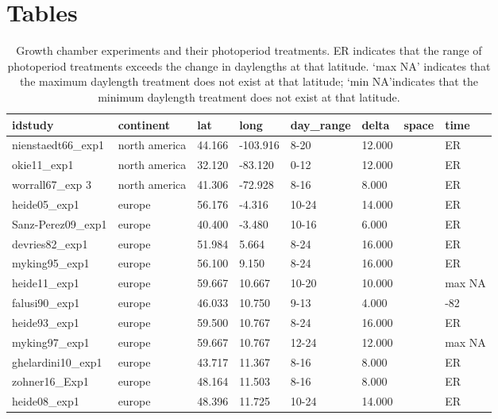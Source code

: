 \documentclass{article}
\begin{document}
\section* {Tables}
\begin{table}[ht]
\centering
\caption{Growth chamber experiments and their photoperiod treatments. ER indicates that the range of photoperiod treatments exceeds the change in daylengths at that latitude. `max NA' indicates that the maximum daylength treatment does not exist at that latitude; `min NA'indicates that the minimum daylength treatment does not exist at that latitude.} 
\label{table:phototreats}
\begin{tabular}{|p{}|p{}|p{}|p{}|p{}|p{}|p{}|p{}|}
  \hline
idstudy & continent & lat & long & day\_range & delta & space & time \\ 
  \hline
nienstaedt66\_exp1 & north america & 44.166 & -103.916 & 8-20 & 12.000 &  & ER \\ 
  okie11\_exp1 & north america & 32.120 & -83.120 & 0-12 & 12.000 &  & ER \\ 
  worrall67\_exp 3 & north america & 41.306 & -72.928 & 8-16 & 8.000 &  & ER \\ 
  heide05\_exp1 & europe & 56.176 & -4.316 & 10-24 & 14.000 &  & ER \\ 
  Sanz-Perez09\_exp1 & europe & 40.400 & -3.480 & 10-16 & 6.000 &  & ER \\ 
  devries82\_exp1 & europe & 51.984 & 5.664 & 8-24 & 16.000 &  & ER \\ 
  myking95\_exp1 & europe & 56.100 & 9.150 & 8-24 & 16.000 &  & ER \\ 
  heide11\_exp1 & europe & 59.667 & 10.667 & 10-20 & 10.000 &  & max NA \\ 
  falusi90\_exp1 & europe & 46.033 & 10.750 & 9-13 & 4.000 &  & -82 \\ 
  heide93\_exp1 & europe & 59.500 & 10.767 & 8-24 & 16.000 &  & ER \\ 
  myking97\_exp1 & europe & 59.667 & 10.767 & 12-24 & 12.000 &  & max NA \\ 
  ghelardini10\_exp1 & europe & 43.717 & 11.367 & 8-16 & 8.000 &  & ER \\ 
  zohner16\_Exp1 & europe & 48.164 & 11.503 & 8-16 & 8.000 &  & ER \\ 
  heide08\_exp1 & europe & 48.396 & 11.725 & 10-24 & 14.000 &  & ER \\ 

\end{tabular}
\end{table}
\end{document}
